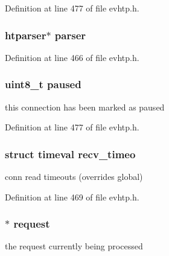 Definition at line 477 of file evhtp.\-h.

\hypertarget{structevhtp__connection__s_accaeb42c4c926437fc7921fa7910911b}{
\subsubsection[{parser}]{\setlength{\rightskip}{0pt plus 5cm}htparser$\ast$ parser}}\label{structevhtp__connection__s_accaeb42c4c926437fc7921fa7910911b}


Definition at line 466 of file evhtp.\-h.

\hypertarget{structevhtp__connection__s_a84bd3ab7c2cbad7fb0b6233504515973}{
\subsubsection[{paused}]{\setlength{\rightskip}{0pt plus 5cm}uint8\-\_\-t paused}}\label{structevhtp__connection__s_a84bd3ab7c2cbad7fb0b6233504515973}
this connection has been marked as paused 

Definition at line 477 of file evhtp.\-h.

\hypertarget{structevhtp__connection__s_a485801666b7fb0cccc50d9fa42e5cbb9}{
\subsubsection[{recv\-\_\-timeo}]{\setlength{\rightskip}{0pt plus 5cm}struct timeval recv\-\_\-timeo}}\label{structevhtp__connection__s_a485801666b7fb0cccc50d9fa42e5cbb9}
conn read timeouts (overrides global) 

Definition at line 469 of file evhtp.\-h.

\hypertarget{structevhtp__connection__s_a55db4995ccc7d4d06340bd057ff9f291}{
\subsubsection[{request}]{$\ast$ request}}\label{structevhtp__connection__s_a55db4995ccc7d4d06340bd057ff9f291}
the request currently being processed 

